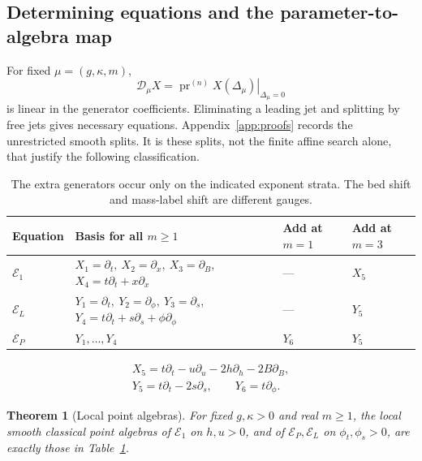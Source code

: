 \documentclass[12pt,a4paper,oneside]{report}
\numberwithin{equation}{chapter}
\newtheorem{theorem}{Theorem}[chapter]
\theoremstyle{definition}
\theoremstyle{remark}\newtheorem{remark}[theorem]{Remark}
\newcommand{\pr}{\operatorname{pr}}
\newif\ifreviewmarks
\DeclareRobustCommand{\review}[1]{{\ifreviewmarks\color{authorblue}\fi #1}}
\begin{document}
\subsection{Determining equations and the parameter-to-algebra map}\label{sec:classification}
For fixed $\mu=(g,\kappa,m)$,
\[
 \mathscr D_\mu X=\left.\pr^{(n)}X(\Delta_\mu)\right|_{\Delta_\mu=0}
\]
is linear in the generator coefficients. Eliminating a leading jet and splitting by free jets gives necessary equations. Appendix~\ref{app:proofs} records the unrestricted smooth splits. It is these splits, not the finite affine search alone, that justify the following classification.

\begin{table}[!ht]\centering\small
\begin{tabularx}{\linewidth}{@{}lXll@{}}
\toprule
Equation & Basis for all $m\ge1$ & Add at $m=1$ & Add at $m=3$\\\midrule
$\mathcal E_1$ & $X_1=\partial_t,\ X_2=\partial_x,\ X_3=\partial_B$,\newline
 $X_4=t\partial_t+x\partial_x$ & --- & $X_5$\\
$\mathcal E_L$ & $Y_1=\partial_t,\ Y_2=\partial_\phi,\ Y_3=\partial_s$,\newline
 $Y_4=t\partial_t+s\partial_s+\phi\partial_\phi$ & --- & $Y_5$\\
$\mathcal E_P$ & $Y_1,\ldots,Y_4$ & $Y_6$ & $Y_5$\\\bottomrule
\end{tabularx}
\[
 \begin{gathered}
 X_5=t\partial_t-u\partial_u-2h\partial_h-2B\partial_B,\\
 Y_5=t\partial_t-2s\partial_s,\qquad Y_6=t\partial_\phi .
 \end{gathered}
\]
\caption[Point symmetries on the positive charts]{\review{The extra generators occur only on the indicated exponent strata. The bed shift and mass-label shift are different gauges.}}
\label{tab:algebras}
\end{table}

\begin{theorem}[Local point algebras]\label{thm:class}
For fixed $g,\kappa>0$ and real $m\ge1$, the local smooth classical point algebras of $\mathcal E_1$ on $h,u>0$, and of $\mathcal E_P,\mathcal E_L$ on $\phi_t,\phi_s>0$, are exactly those in Table~\ref{tab:algebras}.
\end{theorem}
\end{document}
